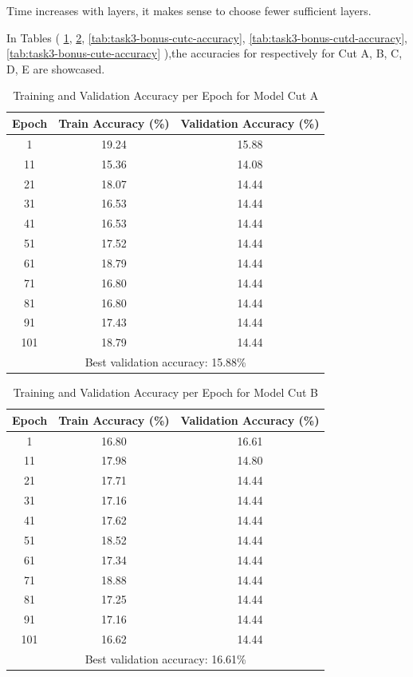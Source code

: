 \documentclass[11pt]{scrartcl}
\begin{document}
Time increases with layers, it makes sense to choose fewer sufficient layers.

In Tables (
	\ref{tab:task3-bonus-cuta-accuracy},
	\ref{tab:task3-bonus-cutb-accuracy},
	\ref{tab:task3-bonus-cutc-accuracy},
	\ref{tab:task3-bonus-cutd-accuracy},
	\ref{tab:task3-bonus-cute-accuracy}
),the accuracies for respectively
for Cut A, B, C, D, E are showcased.

\begin{table}[htbp]
\centering
\caption{Training and Validation Accuracy per Epoch for Model Cut A}
\begin{tabular}{ccc}
\toprule
\textbf{Epoch} & \textbf{Train Accuracy (\%)} & \textbf{Validation Accuracy (\%)} \\
\midrule
1    & 19.24 & 15.88 \\
11   & 15.36 & 14.08 \\
21   & 18.07 & 14.44 \\
31   & 16.53 & 14.44 \\
41   & 16.53 & 14.44 \\
51   & 17.52 & 14.44 \\
61   & 18.79 & 14.44 \\
71   & 16.80 & 14.44 \\
81   & 16.80 & 14.44 \\
91   & 17.43 & 14.44 \\
101  & 18.79 & 14.44 \\
\midrule
\multicolumn{3}{c}{Best validation accuracy: 15.88\%} \\
\bottomrule
\end{tabular}
\label{tab:task3-bonus-cuta-accuracy}
\end{table}

\begin{table}[htbp]
\centering
\caption{Training and Validation Accuracy per Epoch for Model Cut B}
\begin{tabular}{ccc}
\toprule
\textbf{Epoch} & \textbf{Train Accuracy (\%)} & \textbf{Validation Accuracy (\%)} \\
\midrule
1    & 16.80 & 16.61 \\
11   & 17.98 & 14.80 \\
21   & 17.71 & 14.44 \\
31   & 17.16 & 14.44 \\
41   & 17.62 & 14.44 \\
51   & 18.52 & 14.44 \\
61   & 17.34 & 14.44 \\
71   & 18.88 & 14.44 \\
81   & 17.25 & 14.44 \\
91   & 17.16 & 14.44 \\
101  & 16.62 & 14.44 \\
\midrule
\multicolumn{3}{c}{Best validation accuracy: 16.61\%} \\
\bottomrule
\end{tabular}
\label{tab:task3-bonus-cutb-accuracy}
\end{table}
\end{document}
